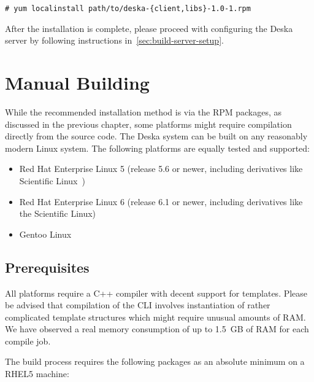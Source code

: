 \documentclass[deska]{subfiles}
\begin{document}
\begin{verbatim}
# yum localinstall path/to/deska-{client,libs}-1.0-1.rpm
\end{verbatim}

After the installation is complete, please proceed with configuring the Deska server by following instructions
in~\ref{sec:build-server-setup}.

\section{Manual Building}

While the recommended installation method is via the RPM packages, as discussed in the previous chapter, some platforms
might require compilation directly from the source code.  The Deska system can be built on any reasonably modern Linux
system.  The following platforms are equally tested and supported:

\begin{itemize}
    \item Red Hat Enterprise Linux \cite{rhel} 5 (release 5.6 or newer, including derivatives like Scientific
        Linux~\cite{scientific-linux})
    \item Red Hat Enterprise Linux 6 (release 6.1 or newer, including derivatives like the Scientific Linux)
    \item Gentoo Linux~\cite{gentoo}
\end{itemize}

\subsection{Prerequisites}

All platforms require a C++ compiler with decent support for templates.  Please be advised that compilation of the CLI
involves instantiation of rather complicated template structures which might require unusual amounts of RAM.  We have
observed a real memory consumption of up to 1.5~GB of RAM for each compile job.

The build process requires the following packages as an absolute minimum on a RHEL5 machine:
\end{document}
